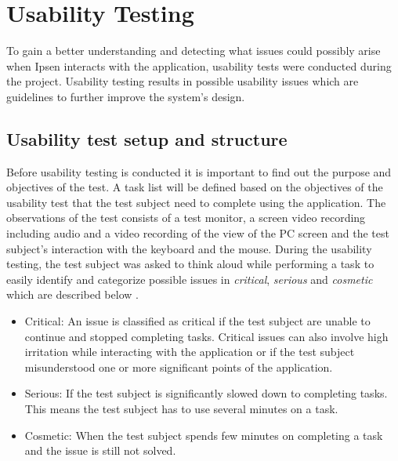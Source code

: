 \section{Usability Testing} \label{sec:usabilitytesting}

To gain a better understanding and detecting what issues could possibly arise when Ipsen interacts with the application, usability tests were conducted during the project.
Usability testing results in possible usability issues which are guidelines to further improve the system's design.

\subsection{Usability test setup and structure}
Before usability testing is conducted it is important to find out the purpose and objectives of the test.
A task list will be defined based on the objectives of the usability test that the test subject need to complete using the application.
The observations of the test consists of a test monitor, a screen video recording including audio and a video recording of the view of the PC screen and the test subject's interaction with the keyboard and the mouse.
During the usability testing, the test subject was asked to think aloud while performing a task to easily identify and categorize possible issues in \textit{critical}, \textit{serious} and \textit{cosmetic} which are described below \citep[p.~154]{brugervenligtwebdesign}.

\begin{itemize}
  	\item 
  	Critical: An issue is classified as critical if the test subject are unable to continue and stopped completing tasks.
	Critical issues can also involve high irritation while interacting with the application or if the test subject misunderstood one or more significant points of the application.
  	\item 
  	Serious: If the test subject is significantly slowed down to completing tasks.
	This means the test subject has to use several minutes on a task.
	\item 
	Cosmetic: When the test subject spends few minutes on completing a task and the issue is still not solved. %
\end{itemize}

